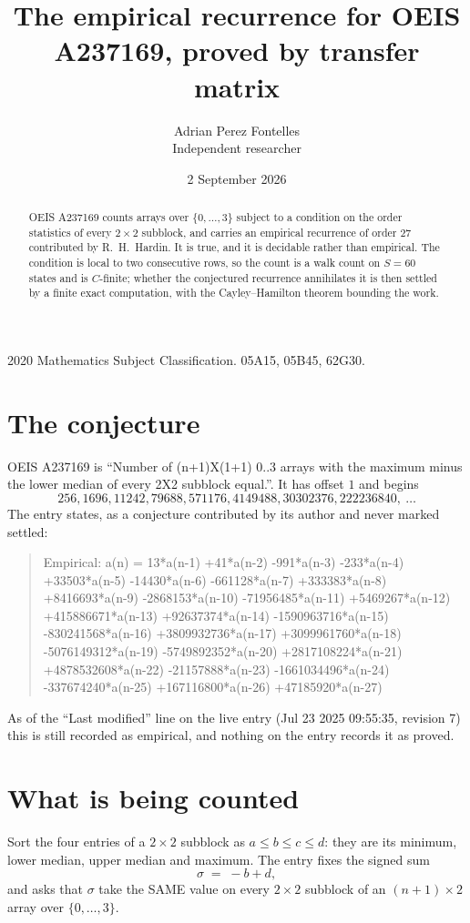 \documentclass[11pt,a4paper]{article}
\title{The empirical recurrence for OEIS A237169, proved by transfer matrix}
\author{Adrian Perez Fontelles\\ \small Independent researcher}
\date{2 September 2026}
\theoremstyle{plain}
\theoremstyle{definition}
\begin{document}
\maketitle

\begin{abstract}
OEIS A237169 counts arrays over $\{0,\dots,3\}$ subject to a condition on the order
statistics of every $2\times2$ subblock, and carries an empirical recurrence of order
$27$ contributed by R.~H.~Hardin. It is true, and it is decidable rather than empirical.
The condition is local to two consecutive rows, so the count is a walk count on $S=60$
states and is $C$-finite; whether the conjectured recurrence annihilates it is then settled by
a finite exact computation, with the Cayley--Hamilton theorem bounding the work.
\end{abstract}

\noindent\small 2020 Mathematics Subject Classification. 05A15, 05B45, 62G30.\normalsize

\section{The conjecture}

OEIS A237169 is ``Number of (n+1)X(1+1) 0..3 arrays with the maximum minus the lower median of every 2X2 subblock equal.''. It has offset $1$ and begins
\[
256, 1696, 11242, 79688, 571176, 4149488, 30302376, 222236840,\ \dots
\]
The entry states, as a conjecture contributed by its author and never marked settled:
\begin{quote}
Empirical: a(n) = 13*a(n-1) +41*a(n-2) -991*a(n-3) -233*a(n-4) +33503*a(n-5) -14430*a(n-6) -661128*a(n-7) +333383*a(n-8) +8416693*a(n-9) -2868153*a(n-10) -71956485*a(n-11) +5469267*a(n-12) +415886671*a(n-13) +92637374*a(n-14) -1590963716*a(n-15) -830241568*a(n-16) +3809932736*a(n-17) +3099961760*a(n-18) -5076149312*a(n-19) -5749892352*a(n-20) +2817108224*a(n-21) +4878532608*a(n-22) -21157888*a(n-23) -1661034496*a(n-24) -337674240*a(n-25) +167116800*a(n-26) +47185920*a(n-27)
\end{quote}
As of the ``Last modified'' line on the live entry (Jul 23 2025 09:55:35, revision 7) this is still
recorded as empirical, and nothing on the entry records it as proved.

\section{What is being counted}

Sort the four entries of a $2\times2$ subblock as $a\le b\le c\le d$: they
are its minimum, lower median, upper median and maximum. The entry fixes the signed sum
\[
\sigma\;=\;-b+d,
\]
and asks that $\sigma$ take the SAME value on every $2\times2$ subblock of an
$(n+1)\times2$ array over $\{0,\dots,3\}$.
\end{document}

